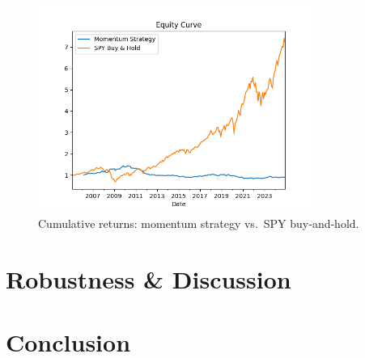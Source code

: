 \documentclass[11pt]{article}
\begin{document}
\begin{figure}[h!]
  \centering
  \includegraphics[width=0.8\textwidth]{figures/equity_curve.png}
  \caption{Cumulative returns: momentum strategy vs.\ SPY buy‑and‑hold.}
\end{figure}

\section{Robustness \& Discussion} \label{sec:robust}

\section{Conclusion} \label{sec:concl}



\end{document}
